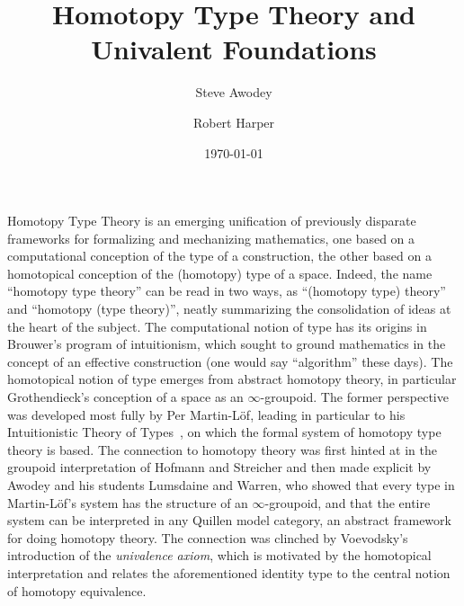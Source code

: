 \documentclass[11pt]{article}
\theoremstyle{remark}
\theoremstyle{definition}
\begin{document}

\title{Homotopy Type Theory and Univalent Foundations}
\author{Steve Awodey \and Robert Harper}
\date{\today}

\maketitle

Homotopy Type Theory is an emerging unification of previously disparate frameworks for formalizing and mechanizing mathematics, one based on a computational conception of the type of a construction, the other based on a homotopical conception of the (homotopy) type of a space.  Indeed, the name ``homotopy type theory'' can be read in two ways, as ``(homotopy type) theory'' and ``homotopy (type theory)'', neatly summarizing the consolidation of ideas at the heart of the subject.  The computational notion of type has its origins in Brouwer's program of intuitionism, which sought to ground mathematics in the concept of an effective construction (one would say ``algorithm'' these days).  The homotopical notion of type emerges from abstract homotopy theory, in particular Grothendieck's conception of a space as an $\infty$-groupoid.  The former perspective was developed most fully by Per Martin-L\"{o}f, leading in particular to his Intuitionistic Theory of Types~\cite{mltt}, on which the formal system of homotopy type theory is based.  The connection to homotopy theory was first hinted at in the groupoid interpretation of Hofmann and Streicher and then made explicit by Awodey and his students Lumsdaine and Warren, who showed that every type in Martin-L\"{o}f's system has the structure of an $\infty$-groupoid, and that the entire system can be interpreted in any Quillen model category, an abstract framework for doing homotopy theory.  The connection was clinched by Voevodsky's introduction of the \emph{univalence axiom}, which is motivated by the homotopical interpretation and relates the aforementioned identity type to the central notion of homotopy equivalence.
\end{document}
